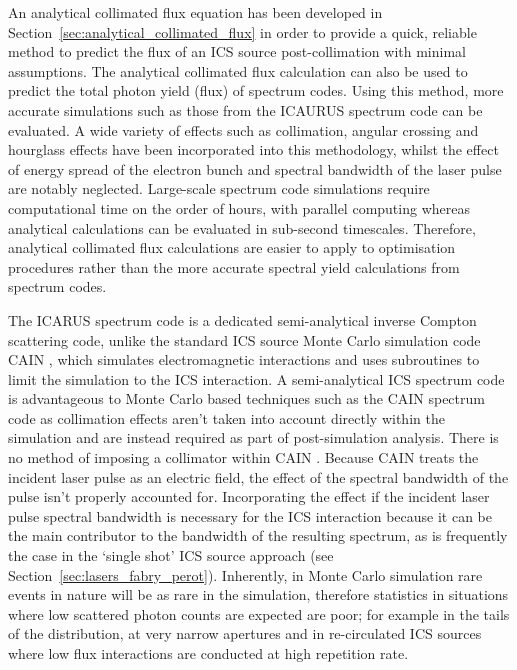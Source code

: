 \documentclass[../main.tex]{subfiles}
\begin{document}
An analytical collimated flux equation has been developed in Section~\ref{sec:analytical_collimated_flux} in order to provide a quick, reliable method to predict the flux of an ICS source post-collimation with minimal assumptions. The analytical collimated flux calculation can also be used to predict the total photon yield (flux) of spectrum codes. Using this method, more accurate simulations such as those from the \textsc{ICAURUS} spectrum code can be evaluated. A wide variety of effects such as collimation, angular crossing and hourglass effects have been incorporated into this methodology, whilst the effect of energy spread of the electron bunch and spectral bandwidth of the laser pulse are notably neglected. Large-scale spectrum code simulations require computational time on the order of hours, with parallel computing whereas analytical calculations can be evaluated in sub-second timescales. Therefore, analytical collimated flux calculations are easier to apply to optimisation procedures rather than the more accurate spectral yield calculations from spectrum codes.   

The \textsc{ICARUS} spectrum code is a dedicated semi-analytical inverse Compton scattering code, unlike the standard ICS source Monte Carlo simulation code \textsc{CAIN} \cite{chen1995cain}, which simulates electromagnetic interactions and uses subroutines to limit the simulation to the ICS interaction. A semi-analytical ICS spectrum code is advantageous to Monte Carlo based techniques such as the \textsc{CAIN} spectrum code as collimation effects aren't taken into account directly within the simulation and are instead required as part of post-simulation analysis. There is no method of imposing a collimator within \textsc{CAIN} \cite{chen1995cain}. Because \textsc{CAIN} treats the incident laser pulse as an electric field, the effect of the spectral bandwidth of the pulse isn't properly accounted for. Incorporating the effect if the incident laser pulse spectral bandwidth is necessary for the ICS interaction because it can be the main contributor to the bandwidth of the resulting spectrum, as is frequently the case in the `single shot' ICS source approach (see Section~\ref{sec:lasers_fabry_perot}). Inherently, in Monte Carlo simulation rare events in nature will be as rare in the simulation, therefore statistics in situations where low scattered photon counts are expected are poor; for example in the tails of the distribution, at very narrow apertures \cite{ranjan2018simulation} and in re-circulated ICS sources where low flux interactions are conducted at high repetition rate. 
\end{document}
